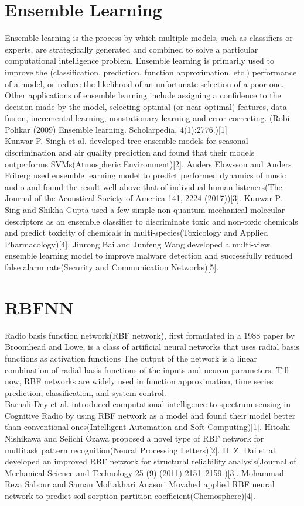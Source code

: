 \documentclass{kththesis}
\begin{document}
\section{Ensemble Learning}
Ensemble learning is the process by which multiple models, such as classifiers or experts, are strategically generated and combined to solve a particular computational intelligence problem. Ensemble learning is primarily used to improve the (classification, prediction, function approximation, etc.) performance of a model, or reduce the likelihood of an unfortunate selection of a poor one. Other applications of ensemble learning include assigning a confidence to the decision made by the model, selecting optimal (or near optimal) features, data fusion, incremental learning, nonstationary learning and error-correcting. (Robi Polikar (2009) Ensemble learning. Scholarpedia, 4(1):2776.)[1]
\\
Kunwar P. Singh et al. developed tree ensemble models for seasonal discrimination and air quality prediction and found that their models outperforms SVMs(Atmospheric Environment)[2]. Anders Elowsson and Anders Friberg used ensemble learning model to predict performed dynamics of music audio and found the result well above that of individual human listeners(The Journal of the Acoustical Society of America 141, 2224 (2017))[3]. Kunwar P. Sing and Shikha Gupta used a few simple non-quantum mechanical molecular descriptors as an ensemble classifier to discriminate toxic and non-toxic chemicals and predict toxicity of chemicals in multi-species(Toxicology and Applied Pharmacology)[4]. Jinrong Bai and Junfeng Wang developed a multi-view ensemble learning model to improve malware detection and successfully reduced false alarm rate(Security and Communication Networks)[5].
\\
\section{RBFNN}
Radio basis function network(RBF network), first formulated in a 1988 paper by Broomhead and Lowe, is a class of artificial neural networks that uses radial basis functions as activation functions The output of the network is a linear combination of radial basis functions of the inputs and neuron parameters. Till now, RBF networks are widely used in  function approximation, time series prediction, classification, and system control.
\\
Barnali Dey et al. introduced computational intelligence to spectrum sensing in Cognitive Radio by using RBF network as a model and found their model better than conventional ones(Intelligent Automation and Soft Computing)[1]. Hitoshi Nishikawa and Seiichi Ozawa proposed a novel type of RBF network for multitask pattern recognition(Neural Processing Letters)[2]. H. Z. Dai et al. developed an improved RBF network for structural reliability analysis(Journal of Mechanical Science and Technology 25 (9) (2011) 2151~2159 )[3]. Mohammad Reza Sabour and Saman Moftakhari Anasori Movahed applied RBF neural network to predict soil sorption partition coefficient(Chemosphere)[4].
\\
\end{document}
